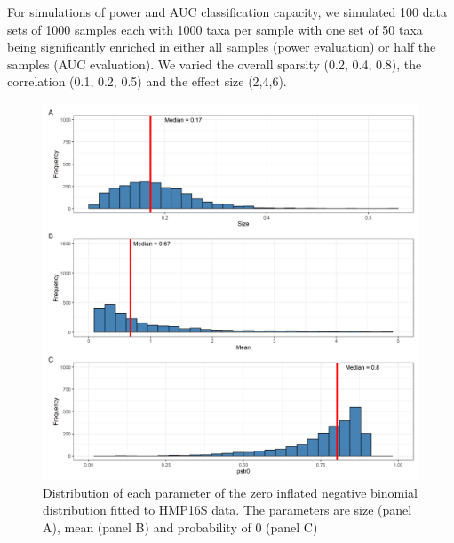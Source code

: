 \documentclass{article}
\begin{document}
\noindent For simulations of power and AUC classification capacity, we simulated 100 data sets of 1000 samples each with 1000 taxa per sample with one set of 50 taxa being significantly enriched in either all samples (power evaluation) or half the samples (AUC evaluation). We varied the overall sparsity (0.2, 0.4, 0.8), the correlation (0.1, 0.2, 0.5) and the effect size (2,4,6). \\



\begin{figure}[h]
    \centering
    \includegraphics[width=0.6\linewidth]{figures/HMP_fit.png}
    \caption{Distribution of each parameter of the zero inflated negative binomial distribution fitted to HMP16S data. The parameters are size (panel A), mean (panel B) and probability of 0 (panel C)}
\end{figure}


\newpage
{}

\end{document}
